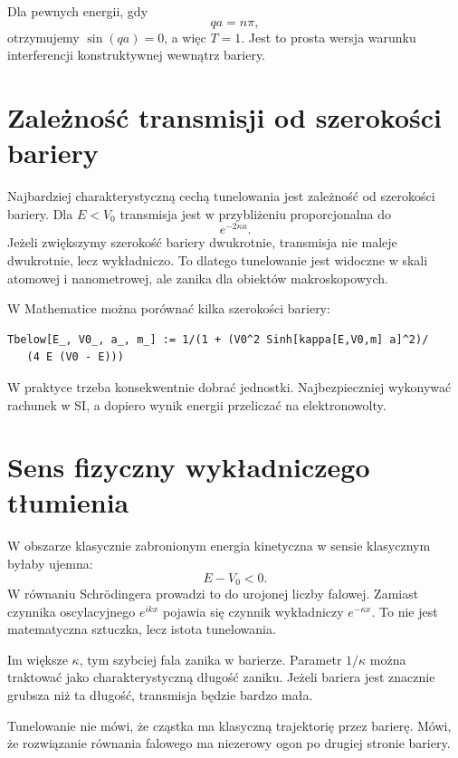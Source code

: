 Dla pewnych energii, gdy
\begin{equation}
    qa=n\pi,
\end{equation}
otrzymujemy \(\sin(qa)=0\), a więc \(T=1\). Jest to prosta wersja warunku interferencji konstruktywnej wewnątrz bariery.

\section{Zależność transmisji od szerokości bariery}

Najbardziej charakterystyczną cechą tunelowania jest zależność od szerokości bariery. Dla \(E<V_0\) transmisja jest w przybliżeniu proporcjonalna do
\[
    e^{-2\kappa a}.
\]
Jeżeli zwiększymy szerokość bariery dwukrotnie, transmisja nie maleje dwukrotnie, lecz wykładniczo. To dlatego tunelowanie jest widoczne w skali atomowej i nanometrowej, ale zanika dla obiektów makroskopowych.

W Mathematice można porównać kilka szerokości bariery:
\begin{verbatim}
Tbelow[E_, V0_, a_, m_] := 1/(1 + (V0^2 Sinh[kappa[E,V0,m] a]^2)/
   (4 E (V0 - E)))
\end{verbatim}
W praktyce trzeba konsekwentnie dobrać jednostki. Najbezpieczniej wykonywać rachunek w SI, a dopiero wynik energii przeliczać na elektronowolty.

\section{Sens fizyczny wykładniczego tłumienia}

W obszarze klasycznie zabronionym energia kinetyczna w sensie klasycznym byłaby ujemna:
\[
    E-V_0<0.
\]
W równaniu Schrödingera prowadzi to do urojonej liczby falowej. Zamiast czynnika oscylacyjnego \(e^{ikx}\) pojawia się czynnik wykładniczy \(e^{-\kappa x}\). To nie jest matematyczna sztuczka, lecz istota tunelowania.

Im większe \(\kappa\), tym szybciej fala zanika w barierze. Parametr \(1/\kappa\) można traktować jako charakterystyczną długość zaniku. Jeżeli bariera jest znacznie grubsza niż ta długość, transmisja będzie bardzo mała.

\begin{remarkbox}
Tunelowanie nie mówi, że cząstka ma klasyczną trajektorię przez barierę. Mówi, że rozwiązanie równania falowego ma niezerowy ogon po drugiej stronie bariery.
\end{remarkbox}

